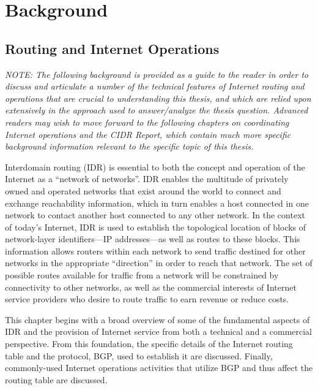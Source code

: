 \chapter{Background}
\label{chap:background}


\section{Routing and Internet Operations}

\emph{NOTE: The following background is provided as a guide to the reader in order to discuss and articulate a number of the technical features of Internet routing and operations that are crucial to understanding this thesis, and which are relied upon extensively in the approach used to answer/analyze the thesis question. Advanced readers may wish to move forward to the following chapters on coordinating Internet operations and the CIDR Report, which contain much more specific background information relevant to the specific topic of this thesis.}

Interdomain routing (IDR) is essential to both the concept and operation of the Internet as a ``network of networks''. IDR enables the multitude of privately owned and operated networks that exist around the world to connect and exchange reachability information, which in turn enables a host connected in one network to contact another host connected to any other network. In the context of today's Internet, IDR is used to establish the topological location of blocks of network-layer identifiers---IP addresses---as well as routes to these blocks. This information allows routers within each network to send traffic destined for other networks in the appropriate ``direction'' in order to reach that network. The set of possible routes available for traffic from a network will be constrained by connectivity to other networks, as well as the commercial interests of Internet service providers who desire to route traffic to earn revenue or reduce costs.

This chapter begins with a broad overview of some of the fundamental aspects of IDR and the provision of Internet service from both a technical and a commercial perspective. From this foundation, the specific details of the Internet routing table and the protocol, BGP, used to establish it are discussed. Finally, commonly-used Internet operations activities that utilize BGP and thus affect the routing table are discussed.

